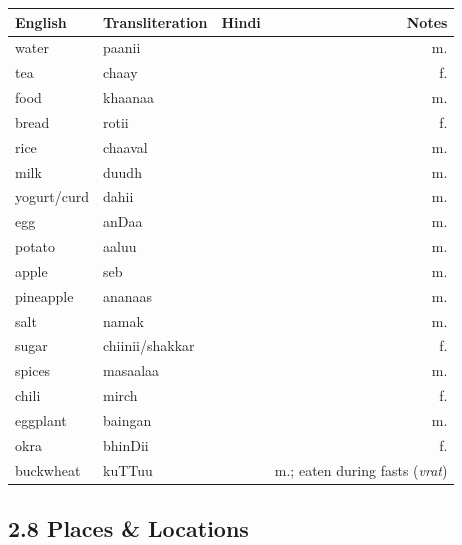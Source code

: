 \begin{tabular}{@{}VTDN@{}}
  \toprule
  English & Transliteration & Hindi & Notes \\
  \midrule
  water  & paanii  &   & m. \\
  tea    & chaay   &    & f. \\
  food   & khaanaa &   & m. \\
  bread  & rotii  &   & f. \\
  rice       & chaaval        &           & m. \\
  milk       & duudh          &             & m. \\
  yogurt/curd & dahii         &             & m. \\
  egg        & anDaa          &            & m. \\
  potato     & aaluu          &             & m. \\
  apple      & seb            &             & m. \\
  pineapple  & ananaas        &          & m. \\
  salt       & namak          &             & m. \\
  sugar      & chiinii/shakkar &   & f. \\
  spices     & masaalaa       &           & m. \\
  chili      & mirch          &           & f. \\
  eggplant   & baingan         &           & m. \\
  okra       & bhinDii         &           & f. \\
  buckwheat  & kuTTuu         &           & m.; eaten during fasts (\textit{vrat}) \\
  \bottomrule
\end{tabular}

\subsection{2.8 Places \& Locations}

